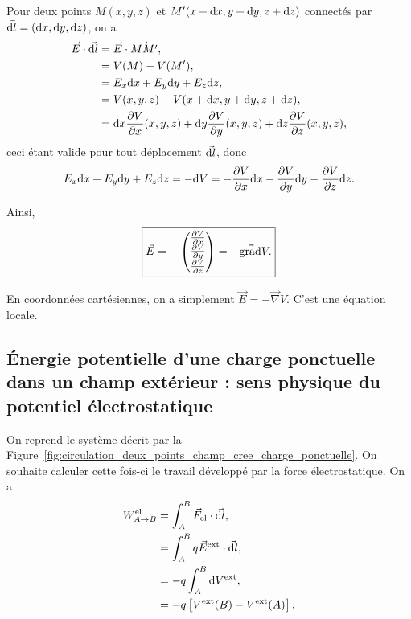         Pour deux points $M(x,y,z)$ et $M'(x+\mathrm{d} x,y+\mathrm{d} y,z+\mathrm{d} z)$ connectés par $\vec{\mathrm{d} l}=(\mathrm{d} x,\mathrm{d} y, \mathrm{d} z)$, on a
        \begin{align}
            \vec{E}\cdot\vec{\mathrm{d} l}
            &=
            \vec{E}\cdot\vec{MM'},\\
            &=
            V(M)-V(M'),\\
            &=
            E_x\mathrm{d} x+E_y\mathrm{d} y+E_z\mathrm{d} z,\\
            &=
            V(x,y,z)-V(x+\mathrm{d} x,y+\mathrm{d} y,z+\mathrm{d} z),\\
            &=\mathrm{d} x\frac{\partial V}{\partial x}(x,y,z)+\mathrm{d} y\frac{\partial V}{\partial y}(x,y,z)+\mathrm{d} z\frac{\partial V}{\partial z}(x,y,z),
        \end{align}
        ceci étant valide pour tout déplacement $\vec{\mathrm{d} l}$, donc 
        \begin{equation}
            E_x\mathrm{d} x+E_y\mathrm{d} y+E_z\mathrm{d} z=-\mathrm{d} V=-\frac{\partial V}{\partial x}\mathrm{d} x-\frac{\partial V}{\partial y}\mathrm{d} y-\frac{\partial V}{\partial z}\mathrm{d} z.
        \end{equation}

        Ainsi, 
        \begin{equation}
            \boxed{
                \vec{E}=-\begin{pmatrix}
                    \frac{\partial V}{\partial x}\\
                    \frac{\partial V}{\partial y}\\
                    \frac{\partial V}{\partial z}
                \end{pmatrix}
                =-\vec{\mathrm{grad}}V.
            }
        \end{equation}

        En coordonnées cartésiennes, on a simplement $\vec{E}=-\vec{\nabla}V$. C'est une équation locale.

    \subsection{Énergie potentielle d'une charge ponctuelle dans un champ extérieur : sens physique du potentiel électrostatique}

        On reprend le système décrit par la Figure~\ref{fig:circulation_deux_points_champ_cree_charge_ponctuelle}. On souhaite calculer cette fois-ci le travail développé par la force électrostatique. On a 
        \begin{align}
            W_{A\to B}^{\text{el}}
            &=
            \int_{A}^{B} \vec{F}_{\text{el}}\cdot\vec{\mathrm{d} l},\\
            &=
            \int_{A}^{B}q\vec{E}^{\text{ext}}\cdot\vec{\mathrm{d} l},\\
            &=
            -q\int_{A}^{B}\mathrm{d} V^{\text{ext}},\\
            &=
            -q\left[
                V^{\text{ext}}(B)-V^{\text{ext}}(A)
            \right].
        \end{align}

